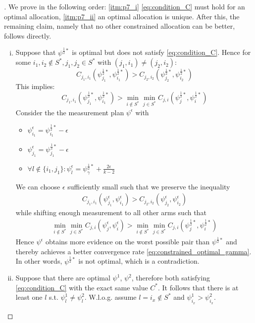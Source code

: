 \begin{proof}[]
  We prove in the following order: \eqref{itm:p7_i} \eqref{eq:condition_C} must hold for an optimal allocation, \eqref{itm:p7_ii} an optimal allocation is unique. After this, the remaining claim, namely that no other constrained allocation can be better, follows directly.
  \begin{enumerate}[(i)]
    \item \label{itm:p7_i} Suppose that $\psi^{\frac{1}{2}*}$ is optimal but does not satisfy \eqref{eq:condition_C}. Hence for some $i_1, i_2 \notin S^*, j_1, j_2 \in S^*$ with $(j_1, i_1) \neq (j_2, i_2)$:
    \[C_{j_1, i_1}(\psi^{\frac{1}{2}*}_{j_1}, \psi^{\frac{1}{2}*}_{i_1}) > C_{j_2, i_2}(\psi^{\frac{1}{2}*}_{j_2}, \psi^{\frac{1}{2}*}_{i_2})\]
    This implies:
    \[C_{j_1, i_1}(\psi^{\frac{1}{2}*}_{j_1}, \psi^{\frac{1}{2}*}_{i_1}) > \min_{i \notin S^*} \min_{j \in S^*}C_{j, i}(\psi^{\frac{1}{2}*}_j, \psi^{\frac{1}{2}*}_i) \]
    Consider the the measurement plan $\psi^\epsilon$ with
    \begin{itemize}
      \item $\psi^\epsilon_{i_1} = \psi^{\frac{1}{2}*}_{i_1} - \epsilon$
      \item $\psi^\epsilon_{j_1} = \psi^{\frac{1}{2}*}_{j_1} - \epsilon$
      \item $\forall l\notin \{i_1, j_1\}: \psi^\epsilon_l = \psi^{\frac{1}{2}*}_\gamma + \frac{2 \epsilon}{k-2}$
    \end{itemize}
    We can choose $\epsilon$ sufficiently small such that we preserve the inequality
    \begin{align}
      C_{j_1, i_1}(\psi^\epsilon_{j_1}, \psi^\epsilon_{i_1}) > C_{j_2, i_2}(\psi^\epsilon_{j_2}, \psi^\epsilon_{i_2})
    \end{align}
    while shifting enough measurement to all other arms such that
    \begin{align}
      \min_{i \notin S^*} \min_{j \in S^*} C_{j, i}(\psi^\epsilon_{j}, \psi^\epsilon_i) > \min_{i \notin S^*} \min_{j \in S^*} C_{j, i}(\psi^{\frac{1}{2}*}_j, \psi^{\frac{1}{2}*}_i)
    \end{align}
    Hence $\psi^\epsilon$ obtains more evidence on the worst possible pair than $\psi^{\frac{1}{2}*}$ and thereby achieves a better convergence rate \eqref{eq:constrained_optimal_gamma}. In other words, $\psi^{\frac{1}{2}*}$ is not optimal, which is a contradiction.

    \item \label{itm:p7_ii} Suppose that there are optimal $\psi^1$, $\psi^2$, therefore both satisfying \eqref{eq:condition_C} with the exact same value $C^*$. It follows that there is at least one $l$ s.t. $\psi^1_{l} \neq \psi^2_{l}$. W.l.o.g. assume $l = i_x \notin S^*$ and $\psi^1_{i_x} > \psi^2_{i_x}$.


\end{enumerate}
\end{proof}
